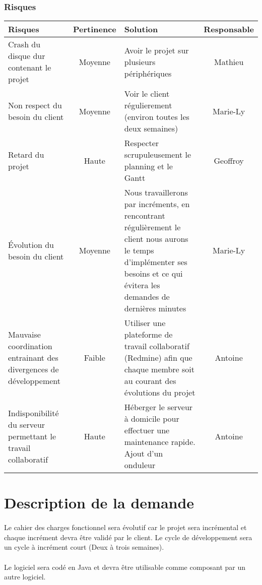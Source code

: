 \documentclass[12pt,a4paper,openany]{article}
\begin{document}
		\subsubsection*{Risques}
		\begin{center}
		\begin{tabular}{|p{5.5cm}|c|p{6.5cm}|c|}
				\hline
				\textbf{Risques} & \textbf{Pertinence} & \textbf{Solution} & \textbf{Responsable} \\
				\hline
				Crash du disque dur contenant le projet & Moyenne & Avoir le projet sur plusieurs périphériques & Mathieu\\
				\hline
				Non respect du besoin du client & Moyenne & Voir le client régulierement (environ toutes les deux semaines) & Marie-Ly\\ 
				\hline
				Retard du projet & Haute & Respecter scrupuleusement le planning et le Gantt & Geoffroy\\
				\hline
				Évolution du besoin du client & Moyenne &  Nous travaillerons par incréments, 
				en rencontrant régulièrement le client  nous aurons le temps d'implémenter ses besoins et 
				ce qui évitera les demandes de dernières minutes & Marie-Ly \\ 
				\hline
				Mauvaise coordination entrainant des divergences de développement& Faible & Utiliser une plateforme de travail collaboratif (Redmine) afin que
				chaque membre soit au courant des évolutions du projet & Antoine \\
				\hline
				Indisponibilité du serveur permettant le travail collaboratif & Haute& Héberger le serveur à domicile pour effectuer une maintenance rapide.
				Ajout d'un onduleur & Antoine  \\
				\hline
			\end{tabular}
		\end{center}	
	\section{Description de la demande}
	\paragraph{}
		Le cahier des charges fonctionnel sera évolutif car le projet sera incrémental et chaque incrément devra 
		être validé par le client. Le cycle de développement sera un cycle à incrément court (Deux à trois semaines).
	\paragraph{}
		Le logiciel sera codé en Java et devra être utilisable comme composant par un autre logiciel.\\
\end{document}
